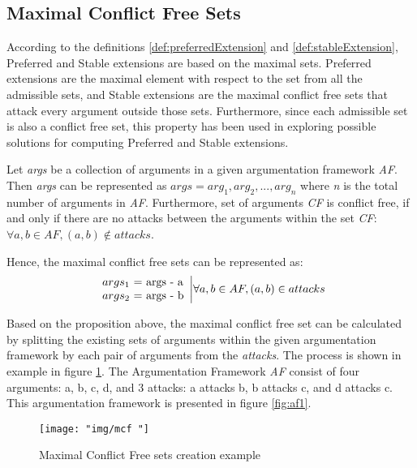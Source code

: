 \subsection{Maximal Conflict Free Sets} \label{section:maxConflictFreeSet}
According to the definitions \ref{def:preferredExtension} and \ref{def:stableExtension}, Preferred and Stable extensions are based on the maximal sets. Preferred extensions are the maximal element with respect to the set from all the admissible sets, and Stable extensions are the maximal conflict free sets that attack every argument outside those sets. Furthermore, since each admissible set is also a conflict free set, this property has been used in exploring possible solutions for computing Preferred and Stable extensions.

Let \textit{args} be a collection of arguments in a given argumentation framework \textit{AF}. Then \textit{args} can be represented as $args=arg_1, arg_2,...,arg_n$ where \textit{n} is the total number of arguments in \textit{AF}. 
Furthermore, set of arguments \textit{CF} is conflict free, if and only if there are no attacks between the arguments within the set \textit{CF}: $\forall a,b \in AF, (a, b) \notin attacks$.

Hence, the maximal conflict free sets can be represented as:
\begin{equation}
\begin{array}{lr}
args_1 $ = $ \text{args} $ - $ \text{a} \\
args_2 $ = $ \text{args} $ - $ \text{b} \\
\end{array} \bigg| \forall a, b \in AF, (a,b) \in attacks
\end{equation}

Based on the proposition above, the maximal conflict free set can be calculated by splitting the existing sets of arguments within the given argumentation framework by each pair of arguments from the \textit{attacks}. The process is shown in example in figure \ref{fig:mcfExample}. The Argumentation Framework \textit{AF} consist of four arguments: a, b, c, d, and 3 attacks: a attacks b, b attacks c, and d attacks c. This argumentation framework is presented in figure \ref{fig:af1}. 

\begin{figure}[h]
	\centering
	\texttt{[image: "img/mcf "]}
	\caption{Maximal Conflict Free sets creation example}
	\label{fig:mcfExample}
\end{figure}

